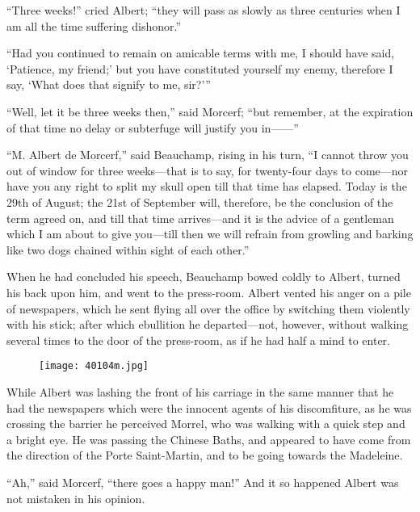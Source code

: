 “Three weeks!” cried Albert; “they will pass as slowly as three
centuries when I am all the time suffering dishonor.”

“Had you continued to remain on amicable terms with me, I should have
said, ‘Patience, my friend;’ but you have constituted yourself my
enemy, therefore I say, ‘What does that signify to me, sir?’”

“Well, let it be three weeks then,” said Morcerf; “but remember, at the
expiration of that time no delay or subterfuge will justify you in——”

“M. Albert de Morcerf,” said Beauchamp, rising in his turn, “I cannot
throw you out of window for three weeks—that is to say, for twenty-four
days to come—nor have you any right to split my skull open till that
time has elapsed. Today is the 29th of August; the 21st of September
will, therefore, be the conclusion of the term agreed on, and till that
time arrives—and it is the advice of a gentleman which I am about to
give you—till then we will refrain from growling and barking like two
dogs chained within sight of each other.”

When he had concluded his speech, Beauchamp bowed coldly to Albert,
turned his back upon him, and went to the press-room. Albert vented his
anger on a pile of newspapers, which he sent flying all over the office
by switching them violently with his stick; after which ebullition he
departed—not, however, without walking several times to the door of the
press-room, as if he had half a mind to enter.

\begin{figure}[ht]
\texttt{[image: 40104m.jpg]}
\end{figure}

While Albert was lashing the front of his carriage in the same manner
that he had the newspapers which were the innocent agents of his
discomfiture, as he was crossing the barrier he perceived Morrel, who
was walking with a quick step and a bright eye. He was passing the
Chinese Baths, and appeared to have come from the direction of the
Porte Saint-Martin, and to be going towards the Madeleine.

“Ah,” said Morcerf, “there goes a happy man!” And it so happened Albert
was not mistaken in his opinion.
